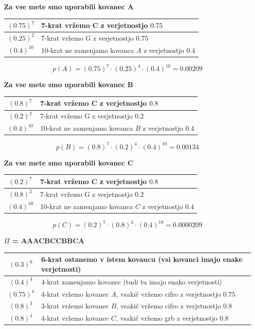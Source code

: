 \documentclass{article}
\begin{document}
\begin{enumerate}
		\textbf{Za vse mete smo uporabili kovanec A}

		\begin{tabular}{c||l}
			$(0.75)^7$ & 7-krat vržemo C z verjetnostjo $0.75$ \\
			\hline
			$(0.25)^2$ & 7-krat vržemo G z verjetnostjo $0.75$ \\
			\hline
			$(0.4)^{10}$ & 10-krat ne zamenjamo kovanca $A$ z verjetnostjo $0.4$
		\end{tabular}

		$$
		p(A) = (0.75)^7 \cdot (0.25)^4 \cdot (0.4)^{10} = 0.00209
		$$

		\textbf{Za vse mete smo uporabili kovanec B}

		\begin{tabular}{c||l}
			$(0.8)^7$ & 7-krat vržemo C z verjetnostjo $0.8$ \\
			\hline
			$(0.2)^2$ & 7-krat vržemo G z verjetnostjo $0.2$ \\
			\hline
			$(0.4)^{10}$ & 10-krat ne zamenjamo kovanca $B$ z verjetnostjo $0.4$
		\end{tabular}

		$$
		p(B) = (0.8)^7 \cdot (0.2)^4 \cdot (0.4)^{10} = 0.00134
		$$

		\textbf{Za vse mete smo uporabili kovanec C}

		\begin{tabular}{c||l}
			$(0.2)^7$ & 7-krat vržemo C z verjetnostjo $0.8$ \\
			\hline
			$(0.8)^2$ & 7-krat vržemo G z verjetnostjo $0.2$ \\
			\hline
			$(0.4)^{10}$ & 10-krat ne zamenjamo kovanca $C$ z verjetnostjo $0.4$
		\end{tabular}

		$$
		p(C) = (0.2)^7 \cdot (0.8)^4 \cdot (0.4)^{10} = 0.0000209
		$$

		\textbf{$\Pi$ = AAACBCCBBCA}

		\begin{tabular}{c||l}
			$(0.3)^6$ & 6-krat ostanemo v istem kovancu (vsi kovanci imajo enake verjetnosti) \\
			\hline
			$(0.4)^4$ & 4-krat zamenjamo kovanec (tudi tu imajo enako verjetnosti) \\
			\hline
			$(0.75)^4$ & 4-krat vržemo kovanec $A$, vsakič vržemo cifro z verjetnostjo $0.75$ \\
			\hline
			$(0.8)^3$ & 3-krat vržemo kovanec $B$, vsakič vržemo cifro z verjetnostjo $0.8$ \\
			\hline
			$(0.8)^4$ & 4-krat vržemo kovanec $C$, vsakič vržemo grb z verjetnostjo $0.8$
		\end{tabular}


\end{enumerate}
\end{document}
